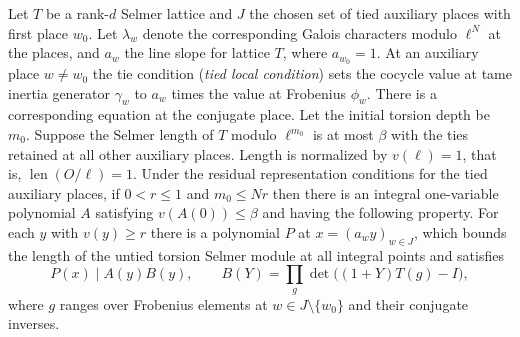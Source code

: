 \begin{lemma}
\label{lem:c-selmer-line-divisibility}
\emitthmsource
Let $T$ be a rank-$d$ Selmer lattice and $J$ the chosen set of tied auxiliary places with first place $w_0$.
Let $\lambda_w$ denote the corresponding Galois characters modulo $\ell^N$ at the places, and $a_w$ the line slope for lattice $T$, where $a_{w_0}=1$.
At an auxiliary place $w\ne w_0$ the tie condition (\emph{tied local condition}) sets the cocycle value at tame inertia generator $\gamma_w$ to $a_w$ times the value at Frobenius $\phi_w$. There is a corresponding equation at the conjugate place.
Let the initial torsion depth be $m_0$. Suppose the Selmer length of $T$ modulo $\ell^{m_0}$ is at most $\beta$ with the ties retained at all other auxiliary places. Length is normalized by $v(\ell)=1$, that is, $\operatorname{len}(O/\ell)=1$.
Under the residual representation conditions for the tied auxiliary places, if $0<r\le1$ and $m_0\le Nr$ then there is an integral one-variable polynomial $A$ satisfying $v(A(0))\le\beta$ and having the following property.
For each $y$ with $v(y)\ge r$ there is a polynomial $P$ at $x=(a_wy)_{w\in J}$, which bounds the length of the untied torsion Selmer module at all integral points and satisfies
\[
 P(x)\mid A(y)B(y),\qquad
 B(Y)=\prod_{g}\det\bigl((1+Y)T(g)-I\bigr),
\]
where $g$ ranges over Frobenius elements at $w\in J\setminus\{w_0\}$ and their conjugate inverses.
\end{lemma}
